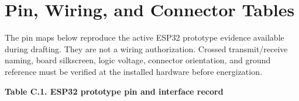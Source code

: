 \chapter{Pin, Wiring, and Connector Tables}\label{ch:pin-wiring-and-connector-tables}

The pin maps below reproduce the active ESP32 prototype evidence
available during drafting. They are not a wiring authorization. Crossed
transmit\slash{}receive naming, board silkscreen, logic voltage, connector
orientation, and ground reference must be verified at the installed
hardware before energization.

\clearpage
\begin{landscape}
\par\medskip\noindent\singlespacing
{}
\textbf{Table C.1. ESP32 prototype pin and interface record}\par


\end{landscape}
